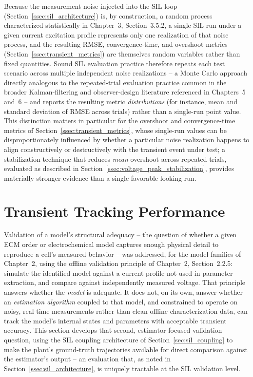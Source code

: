Because the measurement noise injected into the SIL loop (Section~\ref{ssec:sil_architecture}) is, by construction, a random process characterized statistically in Chapter~3, Section~3.5.2, a single SIL run under a given current excitation profile represents only one realization of that noise process, and the resulting RMSE, convergence-time, and overshoot metrics (Section~\ref{ssec:transient_metrics}) are themselves random variables rather than fixed quantities. Sound SIL evaluation practice therefore repeats each test scenario across multiple independent noise realizations -- a Monte Carlo approach directly analogous to the repeated-trial evaluation practice common in the broader Kalman-filtering and observer-design literature referenced in Chapters~5 and~6 -- and reports the resulting metric \emph{distributions} (for instance, mean and standard deviation of RMSE across trials) rather than a single-run point value. This distinction matters in particular for the overshoot and convergence-time metrics of Section~\ref{ssec:transient_metrics}, whose single-run values can be disproportionately influenced by whether a particular noise realization happens to align constructively or destructively with the transient event under test; a stabilization technique that reduces \emph{mean} overshoot across repeated trials, evaluated as described in Section~\ref{ssec:voltage_peak_stabilization}, provides materially stronger evidence than a single favorable-looking run.

\section{Transient Tracking Performance}
\label{sec:transient_tracking}

Validation of a model's structural adequacy -- the question of whether a given ECM order or electrochemical model captures enough physical detail to reproduce a cell's measured behavior -- was addressed, for the model families of Chapter~2, using the offline validation principle of Chapter~2, Section~2.2.5: simulate the identified model against a current profile not used in parameter extraction, and compare against independently measured voltage. That principle answers whether the \emph{model} is adequate. It does not, on its own, answer whether an \emph{estimation algorithm} coupled to that model, and constrained to operate on noisy, real-time measurements rather than clean offline characterization data, can track the model's internal states and parameters with acceptable transient accuracy. This section develops that second, estimator-focused validation question, using the SIL coupling architecture of Section~\ref{sec:sil_coupling} to make the plant's ground-truth trajectories available for direct comparison against the estimator's output -- an evaluation that, as noted in Section~\ref{ssec:sil_architecture}, is uniquely tractable at the SIL validation level.

